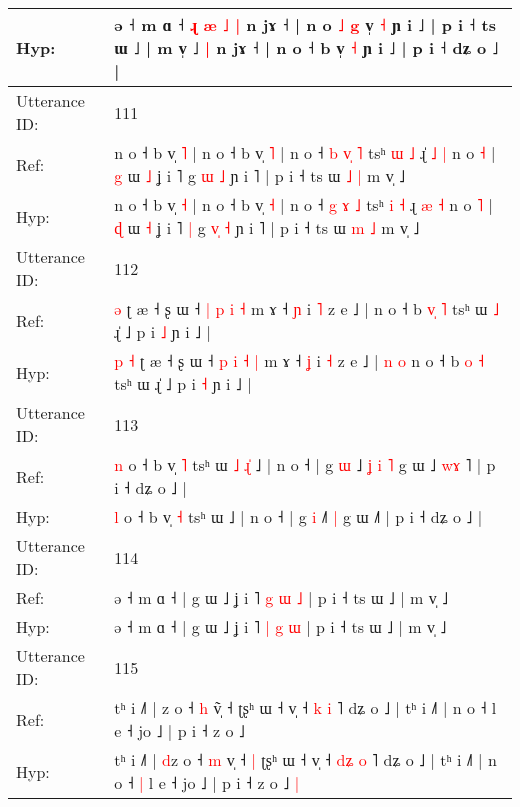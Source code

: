 \documentclass[10pt]{article}
\DeclareRobustCommand{\hl}[1]{{\textcolor{red}{#1}}}
\begin{document}
\begin{longtable}{ll}
 \\
Hyp: & ə ˧ m ɑ ˧\hl{ }\hl{ɻ}\hl{ }\hl{æ}\hl{ }\hl{˩}\hl{ }\hl{|} n jɤ ˧ | n o \hl{˩} \hl{g} v̩ \hl{˧} ɲ i ˩ | p i ˧ ts ɯ ˩ | m v̩ ˩\hl{ }\hl{|} n jɤ ˧ | n o ˧ b v̩ \hl{˧} ɲ i ˩ | p i ˧ dʑ o ˩ |
 \\
\midrule
Utterance ID: & 111 \\
Ref: & n o ˧ b v̩ \hl{˥} | n o ˧ b v̩ \hl{˥} | n o ˧ \hl{b} \hl{v}\hl{̩} \hl{˥} tsʰ \hl{ɯ} \hl{˩} ɻ\hl{̍} \hl{˩} \hl{|} n o \hl{˧} | \hl{g} ɯ \hl{˩} ʝ i ˥\hl{}\hl{} g \hl{}\hl{ɯ} \hl{˩} ɲ i ˥ | p i ˧ ts ɯ \hl{˩} \hl{|} m v̩ ˩
 \\
Hyp: & n o ˧ b v̩ \hl{˧} | n o ˧ b v̩ \hl{˧} | n o ˧ \hl{g} \hl{}\hl{ɤ} \hl{˩} tsʰ \hl{i} \hl{˧} ɻ\hl{} \hl{æ} \hl{˧} n o \hl{˥} | \hl{ɖ} ɯ \hl{˧} ʝ i ˥\hl{ }\hl{|} g \hl{v}\hl{̩} \hl{˧} ɲ i ˥ | p i ˧ ts ɯ \hl{m} \hl{˩} m v̩ ˩
 \\
\midrule
Utterance ID: & 112 \\
Ref: & \hl{}\hl{}\hl{ə} ʈ æ ˧ ʂ ɯ ˧ \hl{|} \hl{p} \hl{i} \hl{˧} m ɤ ˧ \hl{ɲ} i \hl{˥} z e ˩ |\hl{}\hl{}\hl{}\hl{} n o ˧ b \hl{v}\hl{̩} \hl{˥} tsʰ ɯ\hl{ }\hl{˩} ɻ̍ ˩ p i \hl{˩} ɲ i ˩ |
 \\
Hyp: & \hl{p}\hl{ }\hl{˧} ʈ æ ˧ ʂ ɯ ˧ \hl{p} \hl{i} \hl{˧} \hl{|} m ɤ ˧ \hl{ʝ} i \hl{˧} z e ˩ |\hl{ }\hl{n}\hl{ }\hl{o} n o ˧ b \hl{}\hl{o} \hl{˧} tsʰ ɯ\hl{}\hl{} ɻ̍ ˩ p i \hl{˧} ɲ i ˩ |
 \\
\midrule
Utterance ID: & 113 \\
Ref: & \hl{n} o ˧ b v̩ \hl{˥} tsʰ ɯ\hl{ }\hl{˩}\hl{ }\hl{ɻ}\hl{̍} ˩ | n o ˧ | g \hl{ɯ} ˩\hl{ }\hl{ʝ}\hl{ }\hl{i} \hl{˥} g ɯ ˩\hl{ }\hl{w}\hl{ɤ}\hl{ }˥ | p i ˧ dʑ o ˩ |
 \\
Hyp: & \hl{l} o ˧ b v̩ \hl{˧} tsʰ ɯ\hl{}\hl{}\hl{}\hl{}\hl{} ˩ | n o ˧ | g \hl{i} ˩\hl{}\hl{}\hl{}\hl{˥} \hl{|} g ɯ ˩\hl{}\hl{}\hl{}\hl{}˥ | p i ˧ dʑ o ˩ |
 \\
\midrule
Utterance ID: & 114 \\
Ref: & ə ˧ m ɑ ˧ | g ɯ ˩ ʝ i ˥ \hl{g} \hl{ɯ} \hl{˩} | p i ˧ ts ɯ ˩ | m v̩ ˩
 \\
Hyp: & ə ˧ m ɑ ˧ | g ɯ ˩ ʝ i ˥ \hl{|} \hl{g} \hl{ɯ} | p i ˧ ts ɯ ˩ | m v̩ ˩
 \\
\midrule
Utterance ID: & 115 \\
Ref: & tʰ i ˩˥ | \hl{}z o ˧ \hl{h} v\hl{̃}̩ ˧\hl{}\hl{} ʈʂʰ ɯ ˧ v̩ ˧ \hl{}\hl{k} \hl{i} ˥ dʑ o ˩ | tʰ i ˩˥ | n o ˧\hl{}\hl{} l e ˧ jo ˩ | p i ˧ z o ˩\hl{}\hl{}
 \\
Hyp: & tʰ i ˩˥ | \hl{d}z o ˧ \hl{m} v\hl{}̩ ˧\hl{ }\hl{|} ʈʂʰ ɯ ˧ v̩ ˧ \hl{d}\hl{ʑ} \hl{o} ˥ dʑ o ˩ | tʰ i ˩˥ | n o ˧\hl{ }\hl{|} l e ˧ jo ˩ | p i ˧ z o ˩\hl{ }\hl{|}

\end{longtable}
\end{document}
